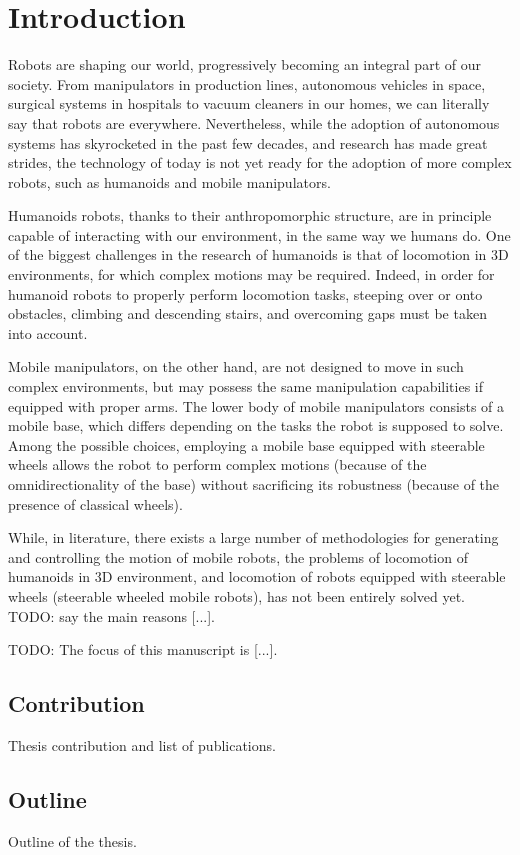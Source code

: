 \chapter{Introduction}
Robots are shaping our world, progressively becoming an integral part of our 
society. From manipulators in production lines, autonomous vehicles in 
space, surgical systems in hospitals to vacuum cleaners in our homes, we can 
literally say that robots are everywhere. Nevertheless, while the adoption of
autonomous systems has skyrocketed in the past few decades, and research has
made great strides, the technology of today
is not yet ready for the adoption of more complex robots, such as humanoids
and mobile manipulators.

Humanoids robots, thanks to their anthropomorphic structure, are in principle 
capable of interacting with our environment, in the same way we humans do.
One of the biggest challenges in the research of humanoids is that of 
locomotion in 3D environments, for which complex motions may be required.
Indeed, in order for humanoid robots to properly perform locomotion tasks, 
steeping over or onto obstacles, climbing and descending stairs, and 
overcoming gaps must be taken into account. 

Mobile manipulators, on the other hand, are not designed to move in such 
complex environments, but may possess the same manipulation capabilities if 
equipped with proper arms. The lower body of mobile manipulators consists
of a mobile base, which differs depending on the tasks the robot is
supposed to solve. Among the possible choices, employing a mobile base equipped 
with steerable wheels allows the robot to perform complex motions (because 
of the omnidirectionality of the base) without sacrificing its robustness
(because of the presence of classical wheels).

While, in literature, there exists a large number of methodologies for
generating and controlling the motion of mobile robots, the problems 
of locomotion of humanoids in 3D environment, and locomotion of robots 
equipped with steerable wheels (steerable wheeled mobile robots), has not been 
entirely solved yet. TODO: say the main reasons [...].

TODO: The focus of this manuscript is [...].

\section{Contribution}
Thesis contribution and list of publications.

\section{Outline}
Outline of the thesis.
